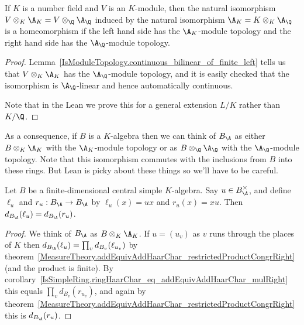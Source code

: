 \begin{corollary}
  \label{NumberField.AdeleRing.ModuleBaseChangeContinuousLinearEquiv}
  \leanok
  If $K$ is a number field and $V$ is an $K$-module, then
  the natural isomorphism $V\otimes_K\A_K=V\otimes_{\Q}\A_{\Q}$ induced by the natural
  isomorphism $\A_K=K\otimes_K\A_{\Q}$ is a homeomorphism if the left hand side has the $\A_K$-module
  topology and the right hand side has the $\A_{\Q}$-module topology.
\end{corollary}
\begin{proof}
  \leanok
  Lemma~\ref{IsModuleTopology.continuous_bilinear_of_finite_left} tells us that $V\otimes_K\A_K$
  has the $\A_{\Q}$-module topology, and it is easily checked that the isomorphism is
  $\A_{\Q}$-linear and hence automatically continuous.

  Note that in the Lean we prove this for a general extension $L/K$ rather than $K/\Q$.
\end{proof}

As a consequence, if $B$ is a $K$-algebra then we can think of $B_{\A}$ as either $B\otimes_K\A_K$
with the $\A_K$-module topology or as $B\otimes_{\Q}\A_{\Q}$ with the $\A_{\Q}$-module
topology. Note that this isomorphism commutes with the inclusions from $B$ into these rings.
But Lean is picky about these things so we'll have to be careful.

\begin{theorem}
  \label{NumberField.AdeleRing.isCentralSimple_addHaarScalarFactor_left_mul_eq_right_mul}
  \leanok
  Let $B$ be a finite-dimensional central simple $K$-algebra.
  Say $u\in B_{\A}^\times$, and define $\ell_u$ and $r_u:B_{\A}\to B_{\A}$ by
  $\ell_u(x)=ux$ and $r_u(x)=xu$. Then $d_{B_{\A}}(\ell_u)=d_{B_{\A}}(r_u)$.
\end{theorem}
\begin{proof}
  We think of $B_{\A}$ as $B\otimes_K\A_K$.
  If $u=(u_v)$ as $v$ runs through the places of $K$ then
  $d_{B_{\A}}(\ell_u)=\prod_v d_{B_v}(\ell_{u_v})$ by
  theorem~\ref{MeasureTheory.addEquivAddHaarChar_restrictedProductCongrRight} (and the product is finite).
  By corollary~\ref{IsSimpleRing.ringHaarChar_eq_addEquivAddHaarChar_mulRight}
  this equals $\prod_v d_{B_v}(r_{u_v})$, and again by
  theorem~\ref{MeasureTheory.addEquivAddHaarChar_restrictedProductCongrRight} this is $d_{B_{\A}}(r_u)$.
\end{proof}

